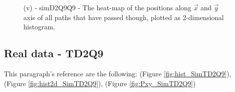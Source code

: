 \documentclass[class=article, crop=false]{standalone}
\begin{document}
\begin{figure}[!htb]
    \centering
        \quad\quad
    \caption{(v) - simD2Q9Q9 - The heat-map of the positions along $\vec x$ and $\vec y$ axis of all paths that have passed though, plotted as 2-dimensional histogram.}
    \label{fig:Pxy_SimD2Q9Q9}
\end{figure}


\FloatBarrier
\subsection{Real data - TD2Q9}
This paragraph's reference are the following: (Figure \ref{fig:hist_SimTD2Q9}), (Figure \ref{fig:hist2d_SimTD2Q9}), (Figure \ref{fig:Pxy_SimTD2Q9}) 
\end{document}
